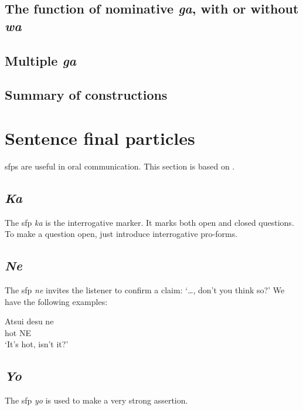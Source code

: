 \documentclass[UTF8, a4paper, oneside, scheme=plain]{ctexrep}
\newcommand*{\citesec}[1]{\S~{#1}}
\newcommand{\corpus}[1]{\emph{#1}}
\newcommand{\translate}[1]{`#1'}
\begin{document}
\subsection{The function of nominative \corpus{ga}, with or without \corpus{wa}} 

\subsection{Multiple \corpus{ga}}\label{sec:multiple-ga}

\subsection{Summary of constructions}\label{sec:wa-ga-template}

\section{Sentence final particles}\label{sec:sfp}

\ac{sfp}s are useful in oral communication.
This section is based on \citet[\citesec{6.4}]{akiyama2012japanese}.

\subsection{\corpus{Ka}}

The \ac{sfp} \corpus{ka} is the interrogative marker.
It marks both open and closed questions.
To make a question open,
just introduce interrogative pro-forms.

\subsection{\corpus{Ne}}

The \ac{sfp} \corpus{ne} invites the listener to confirm a claim:
\translate{\dots, don't you think so?}
We have the following examples:
\begin{exe}
    \ex \gll Atsui desu ne  \\
    hot {} NE  \\
    \glt \translate{It's hot, isn't it?}
\end{exe}

\subsection{\corpus{Yo}}

The \ac{sfp} \corpus{yo} is used to make a very strong assertion.
\end{document}
